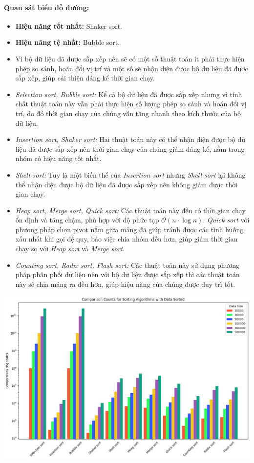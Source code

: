     \paragraph{Quan sát biểu đồ đường:}
    \begin{itemize}
        \item \textbf{Hiệu năng tốt nhất:} Shaker sort.
        \item \textbf{Hiệu năng tệ nhất:} Bubble sort.
        \item Vì bộ dữ liệu đã được sắp xếp nên sẽ có một số thuật toán ít phải thực hiện phép so sánh, hoán đổi vị trí và một số sẽ nhận diện được bộ dữ liệu đã được sắp xếp, giúp cải thiện đáng kể thời gian chạy.
        \item \textit{Selection sort, Bubble sort: } Kể cả bộ dữ liệu đã được sắp xếp nhưng vì tính chất thuật toán này vẫn phải thực hiện số lượng phép so sánh và hoán đổi vị trí, do đó thời gian chạy của chúng vẫn tăng nhanh theo kích thước của bộ dữ liệu.
        \item \textit{Insertion sort, Shaker sort: } Hai thuật toán này có thể nhận diện được bộ dữ liệu đã được sắp xếp nên thời gian chạy của chúng giảm đáng kể, nằm trong nhóm có hiệu năng tốt nhất.
        \item \textit{Shell sort: } Tuy là một biến thể của \textit{Insertion sort} nhưng \textit{Shell sort} lại không thể nhận diện được bộ dữ liệu đã được sắp xếp nên không giảm được thời gian chạy.
        \item \textit{Heap sort, Merge sort, Quick sort:} Các thuật toán này đều có thời gian chạy ổn định và tăng chậm, phù hợp với độ phức tạp $\mathcal{O}(n \cdot \log n)$. \textit{Quick sort} với phương pháp chọn pivot nằm giữa mảng đã giúp tránh được các tình huống xấu nhất khi gọi đệ quy, bảo việc chia nhóm đều hơn, giúp giảm thời gian chạy so với \textit{Heap sort} và \textit{Merge sort}.
        \item \textit{Counting sort, Radix sort, Flash sort:} Các thuật toán này sử dụng phương pháp phân phối dữ liệu nên với bộ dữ liệu được sắp xếp thì các thuật toán này sẽ chia mảng ra đều hơn, giúp hiệu năng của chúng được duy trì tốt.
    \end{itemize}    

    \includegraphics[width = 1\linewidth]{img/experiment/comparison/COMPARISON_SORTED.jpg}
